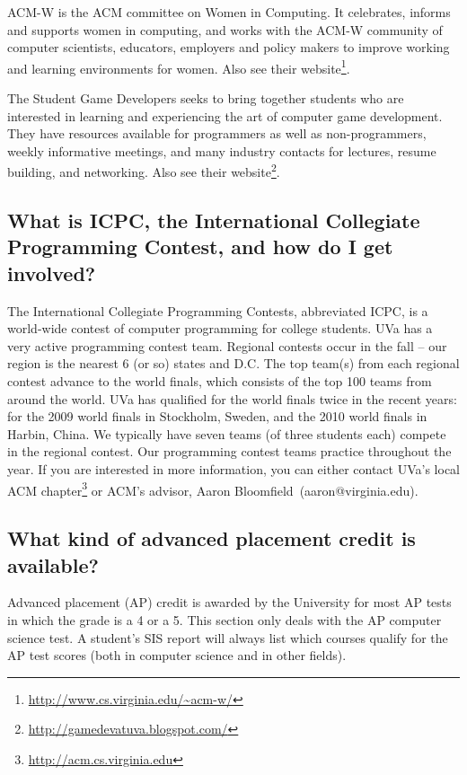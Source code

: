 \documentclass[10pt,letter]{book}
\makeatletter
\newcommand{\acmadvisor}{Aaron Bloomfield}
\newcommand{\acmadvisoremail}{aaron@virginia.edu}
\newcommand{\myurl}[1]{\footnote{\scriptsize\url{#1}}}
\makeatother
\begin{document}
ACM-W is the ACM committee on Women in Computing. It celebrates,
informs and supports women in computing, and works with the ACM-W
community of computer scientists, educators, employers and policy
makers to improve working and learning environments for women. Also
see their website\myurl{http://www.cs.virginia.edu/~acm-w/}.

The Student Game Developers seeks to bring together students who are
interested in learning and experiencing the art of computer game
development. They have resources available for programmers as well as
non-programmers, weekly informative meetings, and many industry
contacts for lectures, resume building, and networking. Also see their
website\myurl{http://gamedevatuva.blogspot.com/}. 

\subsection{What is ICPC, the International Collegiate Programming
  Contest, and how do I get involved?}

The International Collegiate Programming Contests, abbreviated ICPC,
is a world-wide contest of computer programming for college
students. UVa has a very active programming contest team. Regional
contests occur in the fall – our region is the nearest 6 (or so)
states and D.C. The top team(s) from each regional contest advance to
the world finals, which consists of the top 100 teams from around the
world. UVa has qualified for the world finals twice in the recent
years: for the 2009 world finals in Stockholm, Sweden, and the 2010
world finals in Harbin, China. We typically have seven teams (of three
students each) compete in the regional contest. Our programming
contest teams practice throughout the year. If you are interested in
more information, you can either contact UVa’s local ACM
chapter\myurl{http://acm.cs.virginia.edu} or ACM’s advisor,
\acmadvisor\ (\acmadvisoremail).

\subsection{What kind of advanced placement credit is available?}
\label{applacement}

Advanced placement (AP) credit is awarded by the University for most
AP tests in which the grade is a 4 or a 5. This section only deals
with the AP computer science test. A student's SIS report will
always list which courses qualify for the AP test scores (both in
computer science and in other fields).
\end{document}
